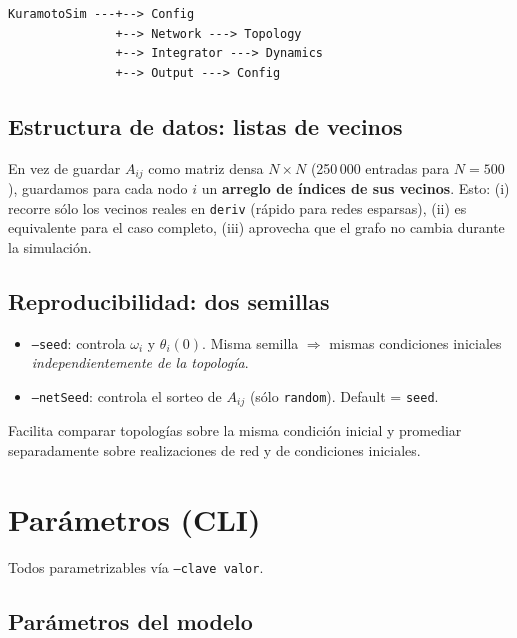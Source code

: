 \documentclass[11pt,a4paper]{article}
\begin{document}
\begin{lstlisting}
KuramotoSim ---+--> Config
               +--> Network ---> Topology
               +--> Integrator ---> Dynamics
               +--> Output ---> Config
\end{lstlisting}

\subsection*{Estructura de datos: listas de vecinos}

En vez de guardar $A_{ij}$ como matriz densa $N\times N$ (250\,000 entradas para $N=500$), guardamos para cada nodo $i$ un \textbf{arreglo de índices de sus vecinos}. Esto: (i) recorre sólo los vecinos reales en \texttt{deriv} (rápido para redes esparsas), (ii) es equivalente para el caso completo, (iii) aprovecha que el grafo no cambia durante la simulación.

\subsection*{Reproducibilidad: dos semillas}

\begin{itemize}
\item \texttt{--seed}: controla $\omega_i$ y $\theta_i(0)$. Misma semilla $\Rightarrow$ mismas condiciones iniciales \emph{independientemente de la topología}.
\item \texttt{--netSeed}: controla el sorteo de $A_{ij}$ (sólo \texttt{random}). Default = \texttt{seed}.
\end{itemize}

Facilita comparar topologías sobre la misma condición inicial y promediar separadamente sobre realizaciones de red y de condiciones iniciales.

\section{Parámetros (CLI)}

Todos parametrizables vía \texttt{--clave valor}.

\subsection*{Parámetros del modelo}
\end{document}
